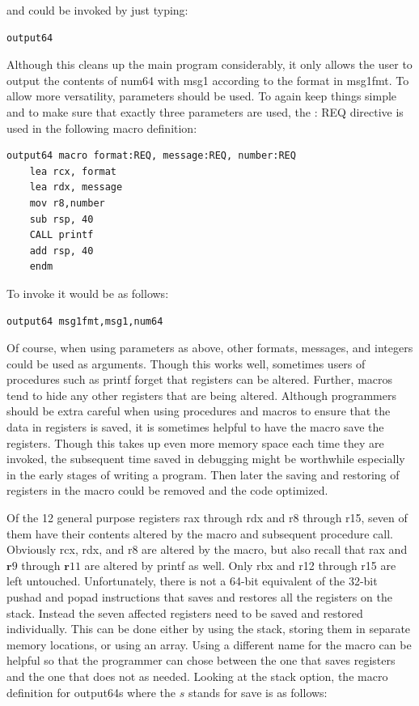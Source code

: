 \documentclass[10pt]{article}
\begin{document}
and could be invoked by just typing:

\begin{verbatim}
output64
\end{verbatim}

Although this cleans up the main program considerably, it only allows the user to output the contents of num64 with msg1 according to the format in msg1fmt. To allow more versatility, parameters should be used. To again keep things simple and to make sure that exactly three parameters are used, the : REQ directive is used in the following macro definition:

\begin{verbatim}
output64 macro format:REQ, message:REQ, number:REQ
    lea rcx, format
    lea rdx, message
    mov r8,number
    sub rsp, 40
    CALL printf
    add rsp, 40
    endm
\end{verbatim}

To invoke it would be as follows:

\begin{verbatim}
output64 msg1fmt,msg1,num64
\end{verbatim}

Of course, when using parameters as above, other formats, messages, and integers could be used as arguments. Though this works well, sometimes users of procedures such as printf forget that registers can be altered. Further, macros tend to hide any other registers that are being altered. Although programmers should be extra careful when using procedures and macros to ensure that the data in registers is saved, it is sometimes helpful to have the macro save the registers. Though this takes up even more memory space each time they are invoked, the subsequent time saved in debugging might be worthwhile especially in the early stages of writing a program. Then later the saving and restoring of registers in the macro could be removed and the code optimized.

Of the 12 general purpose registers rax through rdx and r8 through r15, seven of them have their contents altered by the macro and subsequent procedure call. Obviously rcx, rdx, and r8 are altered by the macro, but also recall that rax and $\mathbf{r} 9$ through $\mathbf{r} 11$ are altered by printf as well. Only rbx and r12 through r15 are left untouched. Unfortunately, there is not a 64-bit equivalent of the 32-bit pushad and popad instructions that saves and restores all the registers on the stack. Instead the seven affected registers need to be saved and restored individually. This can be done either by using the stack, storing them in separate memory locations, or using an array. Using a different name for the macro can be helpful so that the programmer can chose between the one that saves registers and the one that does not as needed. Looking at the stack option, the macro definition for output64s where the $s$ stands for save is as follows:
\end{document}
